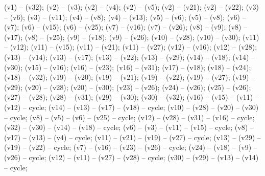  (v1) -- (v32);
 (v2) -- (v3);
 (v2) -- (v4);
 (v2) -- (v5);
 (v2) -- (v21);
 (v2) -- (v22);
 (v3) -- (v6);
 (v3) -- (v11);
 (v4) -- (v8);
 (v4) -- (v13);
 (v5) -- (v6);
 (v5) -- (v8);
 (v6) -- (v7);
 (v6) -- (v15);
 (v6) -- (v25);
 (v7) -- (v16);
 (v7) -- (v26);
 (v8) -- (v9);
 (v8) -- (v17);
 (v8) -- (v25);
 (v9) -- (v18);
 (v9) -- (v26);
 (v10) -- (v28);
 (v10) -- (v30);
 (v11) -- (v12);
 (v11) -- (v15);
 (v11) -- (v21);
 (v11) -- (v27);
 (v12) -- (v16);
 (v12) -- (v28);
 (v13) -- (v14);
 (v13) -- (v17);
 (v13) -- (v22);
 (v13) -- (v29);
 (v14) -- (v18);
 (v14) -- (v30);
 (v15) -- (v16);
 (v16) -- (v23);
 (v16) -- (v31);
 (v17) -- (v18);
 (v18) -- (v24);
 (v18) -- (v32);
 (v19) -- (v20);
 (v19) -- (v21);
 (v19) -- (v22);
 (v19) -- (v27);
 (v19) -- (v29);
 (v20) -- (v28);
 (v20) -- (v30);
 (v23) -- (v26);
 (v24) -- (v26);
 (v25) -- (v26);
 (v27) -- (v28);
 (v28) -- (v31);
 (v29) -- (v30);
 (v30) -- (v32);
 (v16) -- (v15) -- (v11) -- (v12) -- cycle;
 (v14) -- (v13) -- (v17) -- (v18) -- cycle;
 (v10) -- (v28) -- (v20) -- (v30) -- cycle;
 (v8) -- (v5) -- (v6) -- (v25) -- cycle;
 (v12) -- (v28) -- (v31) -- (v16) -- cycle;
 (v32) -- (v30) -- (v14) -- (v18) -- cycle;
 (v6) -- (v3) -- (v11) -- (v15) -- cycle;
 (v8) -- (v17) -- (v13) -- (v4) -- cycle;
 (v11) -- (v21) -- (v19) -- (v27) -- cycle;
 (v13) -- (v29) -- (v19) -- (v22) -- cycle;
 (v7) -- (v16) -- (v23) -- (v26) -- cycle;
 (v24) -- (v18) -- (v9) -- (v26) -- cycle;
 (v12) -- (v11) -- (v27) -- (v28) -- cycle;
 (v30) -- (v29) -- (v13) -- (v14) -- cycle;

